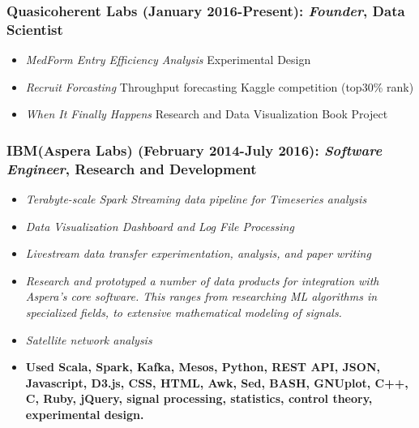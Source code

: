 \documentclass[a4paper,10pt,notitlepage]{article}
\begin{document}
\subsubsection*{Quasicoherent Labs (January 2016-Present): \textit{Founder}, Data Scientist}
  \begin{itemize}
    \vspace{-5pt}\item  \textit{MedForm Entry Efficiency Analysis} Experimental Design
    \vspace{-5pt}\item \textit{Recruit Forcasting} Throughput forecasting Kaggle competition (top30\% rank)
    \vspace{-5pt}\item \textit{When It Finally Happens} Research and Data Visualization Book Project
  \end{itemize}

\subsubsection*{IBM(Aspera Labs) (February 2014-July 2016): \textit{Software Engineer}, Research and Development}
  \begin{itemize}
  \vspace{-5pt}\item  \textit{Terabyte-scale Spark Streaming data pipeline for Timeseries analysis}
  \vspace{-5pt}\item  \textit{Data Visualization Dashboard and Log File Processing}
  \vspace{-5pt}\item  \textit{Livestream data transfer experimentation, analysis, and paper writing}
  \vspace{-5pt}\item  \textit{Research and prototyped a number of data products for integration with Aspera's core software. This ranges from researching ML algorithms in specialized fields, to extensive mathematical modeling of signals.}
  \vspace{-5pt}\item  \textit{Satellite network analysis}
  \vspace{-5pt}\item   \textbf{Used Scala, Spark, Kafka, Mesos, Python, REST API, JSON, Javascript, D3.js, CSS, HTML, Awk, Sed, BASH, GNUplot, C++, C, Ruby, jQuery, signal processing, statistics, control theory, experimental design.}
  \end{itemize}
\end{document}
